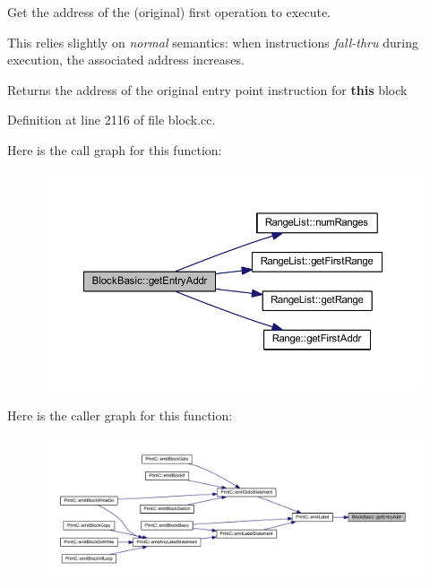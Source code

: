 Get the address of the (original) first operation to execute. 

This relies slightly on {\itshape normal} semantics\+: when instructions {\itshape fall-\/thru} during execution, the associated address increases. \begin{DoxyReturn}{Returns}
the address of the original entry point instruction for {\bfseries{this}} block 
\end{DoxyReturn}


Definition at line 2116 of file block.\+cc.

Here is the call graph for this function\+:
\nopagebreak
\begin{figure}[H]
\begin{center}
\leavevmode
\includegraphics[width=350pt]{class_block_basic_aa77fad87efbfd970ca34b8fc71283be1_cgraph}
\end{center}
\end{figure}
Here is the caller graph for this function\+:
\nopagebreak
\begin{figure}[H]
\begin{center}
\leavevmode
\includegraphics[width=350pt]{class_block_basic_aa77fad87efbfd970ca34b8fc71283be1_icgraph}
\end{center}
\end{figure}
\mbox{\label{class_block_basic_ad0ca2052c33af69cce69198ebfac27d1}} 
